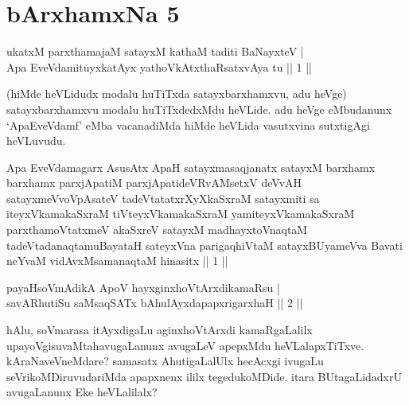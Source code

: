 
\section*{bArxhamxNa 5}


\begin{shl}
ukatxM parxthamajaM satayxM kathaM taditi BaNayxteV | \\
Apa EveVdamituyxkatAyx yathoVkAtxthaRsatxvAya tu \hfill ||  1 || 
\end{shl}

\begin{artha}
(hiMde heVLidudx modalu huTiTxda satayxbarxhamxvu, adu heVge) satayxbarxhamxvu modalu huTiTxdedxMdu heVLide. adu heVge eMbudanunx `ApaEveVdamf' eMba vacanadiMda hiMde heVLida vasutxvina sutxtigAgi heVLuvudu.
\end{artha}


\begin{shl}
Apa EveVdamagarx AsusAtx ApaH satayxmasaqjanatx satayxM barxhamx barxhamx parxjApatiM parxjApatideVRvAMsetxV deVvAH satayxmeVvoVpAsateV tadeVtatatxrXyXkaSxraM satayxmiti sa iteyxVkamakaSxraM tiVteyxVkamakaSxraM yamiteyxVkamakaSxraM parxthamoVtatxmeV akaSxreV satayxM madhayxtoV\s naqtaM tadeVtadanaqtamuBayataH sateyxVna parigaqhiVtaM satayxBUyameVva Bavati neYvaM vidAvxMsamanaqtaM hinasitx || 1 ||
\end{shl}


\begin{shl}
payaHsoVmAdikA ApoV hayxginxhoVtArxdikamaRsu | \\
savARhutiSu saMsaqSATx bAhulAyxdapapxrigarxhaH \hfill ||  2 || 
\end{shl}

\begin{artha}
hAlu, soVmarasa itAyxdigaLu aginxhoVtArxdi kamaRgaLalilx upayoVgisuvaMtahavugaLanunx avugaLeV apepxMdu heVLalapxTiTxve. kAraNaveVneMdare? samasatx AhutigaLalUlx hecAcxgi ivugaLu seVrikoMDiruvudariMda apapxnenx ililx tegedukoMDide. itara BUtagaLidadxrU avugaLanunx Eke heVLalilalx?
\end{artha}

